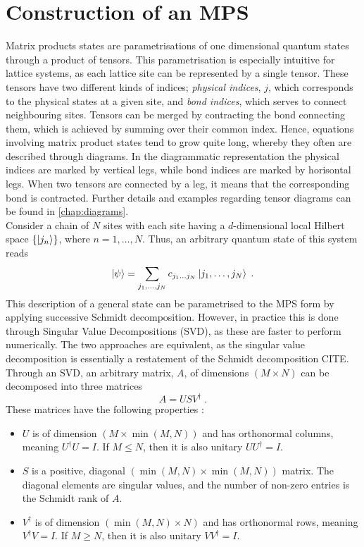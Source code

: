 \section{Construction of an MPS} \label{sec:construct_MPS}
Matrix products states are parametrisations of one dimensional quantum states through a product of tensors. This parametrisation is especially intuitive for lattice systems, as each lattice site can be represented by a single tensor. These tensors have two different kinds of indices; \textit{physical indices}, $j$, which corresponds to the physical states at a given site, and \textit{bond indices}, which serves to connect neighbouring sites. Tensors can be merged by contracting the bond connecting them, which is achieved by summing over their common index. Hence, equations involving matrix product states tend to grow quite long, whereby they often are described through diagrams. In the diagrammatic representation the physical indices are marked by vertical legs, while bond indices are marked by horisontal legs. When two tensors are connected by a leg, it means that the corresponding bond is contracted. Further details and examples regarding tensor diagrams can be found in \ref{chap:diagrams}.\\

Consider a chain of $N$ sites with each site having a $d$-dimensional local Hilbert space $\{ \ket{j_n} \}$, where $n = 1, \ldots, N$. Thus, an arbitrary quantum state of this system reads
\begin{equation}
	\ket{\psi} = \sum_{j_1, \ldots, j_N} c_{j_1 \ldots j_N} \ket{j_1, \ldots, j_N} \; .
	\label{eq:arbstate}
\end{equation}
This description of a general state can be parametrised to the MPS form by applying successive Schmidt decomposition. However, in practice this is done through Singular Value Decompositions (SVD), as these are faster to perform numerically. The two approaches are equivalent, as the singular value decomposition is essentially a restatement of the Schmidt decomposition CITE.
Through an SVD, an arbitrary matrix, $A$, of dimensions $(M \times N)$ can be decomposed into three matrices
\begin{equation}
	A = U S V^{\dag} \; .
\end{equation}
These matrices have the following properties \cite{Schollwock}:
\begin{itemize}
\item
$U$ is of dimension $(M \times \min(M,N))$ and has orthonormal columns, meaning $U^{\dag}U = I$. If $M \leq N$, then it is also unitary $U U^{\dag} = I$.

\item
$S$ is a positive, diagonal $(\min(M,N) \times \min(M,N))$ matrix. The diagonal elements are singular values, and the number of non-zero entries is the Schmidt rank of $A$.

\item
$V^{\dag}$ is of dimension $(\min(M,N) \times N)$ and has orthonormal rows, meaning $V^{\dag}V = I$. If $M \geq N$, then it is also unitary $V V^{\dag} = I$.
\end{itemize} 

